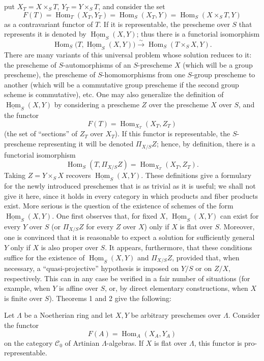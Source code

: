 put $X_T=X\times_ST$, $Y_T=Y\times_ST$, and consider the set
\[
  F(T)=\operatorname{Hom}_T(X_T,Y_T)
      =\operatorname{Hom}_S(X_T,Y)
      =\operatorname{Hom}_S(X\times_ST,Y)
\]
as a contravariant functor of $T$. If it is representable, the prescheme over
$S$ that represents it is denoted by
$\underline{\operatorname{Hom}}_S(X,Y)$; thus there is a functorial
isomorphism
\[
  \operatorname{Hom}_S
  \bigl(T,\underline{\operatorname{Hom}}_S(X,Y)\bigr)
  \xrightarrow{\sim}
  \operatorname{Hom}_S(T\times_SX,Y).
\]
There are many variants of this universal problem whose solution reduces to
it: the prescheme of $S$-automorphisms of an $S$-prescheme $X$ (which will be a
group prescheme), the prescheme of $S$-homomorphisms from one $S$-group
prescheme to another (which will be a commutative group prescheme if the second
group scheme is commutative), etc. One may also generalize the definition of
$\underline{\operatorname{Hom}}_S(X,Y)$ by considering a prescheme $Z$ over
the prescheme $X$ over $S$, and the functor
\[
  F(T)=\operatorname{Hom}_{X_T}(X_T,Z_T)
\]
(the set of “sections” of $Z_T$ over $X_T$). If this functor is representable,
the $S$-prescheme representing it will be denoted $\Pi_{X/S}Z$; hence, by
definition, there is a functorial isomorphism
\[
  \operatorname{Hom}_S(T,\Pi_{X/S}Z)
  =\operatorname{Hom}_{X_T}(X_T,Z_T).
\]
Taking $Z=Y\times_SX$ recovers $\underline{\operatorname{Hom}}_S(X,Y)$. These
definitions give a formulary for the newly introduced preschemes that is as
trivial as it is useful; we shall not give it here, since it holds in every
category in which products and fiber products exist. More serious is the
question of the existence of schemes of the form
$\underline{\operatorname{Hom}}_S(X,Y)$. One first observes that, for fixed
$X$, $\underline{\operatorname{Hom}}_S(X,Y)$ can exist for every $Y$ over $S$
(or $\Pi_{X/S}Z$ for every $Z$ over $X$) only if $X$ is flat over $S$.
Moreover, one is convinced that it is reasonable to expect a solution for
sufficiently general $Y$ only if $X$ is also proper over $S$. It appears,
furthermore, that these conditions suffice for the existence of
$\underline{\operatorname{Hom}}_S(X,Y)$ and $\Pi_{X/S}Z$, provided that, when
necessary, a “quasi-projective” hypothesis is imposed on $Y/S$ or on $Z/X$,
respectively. This can in any case be verified in a fair number of situations
(for example, when $Y$ is affine over $S$, or, by direct elementary
constructions, when $X$ is finite over $S$). Theorems 1 and 2 give the
following:

 Let $\Lambda$ be a Noetherian ring and let $X,Y$ be
arbitrary preschemes over $\Lambda$. Consider the functor
\[
  F(A)=\operatorname{Hom}_A(X_A,Y_A)
\]
on the category $\mathcal C_0$ of Artinian $\Lambda$-algebras. If $X$ is flat
over $\Lambda$, this functor is pro-representable.


